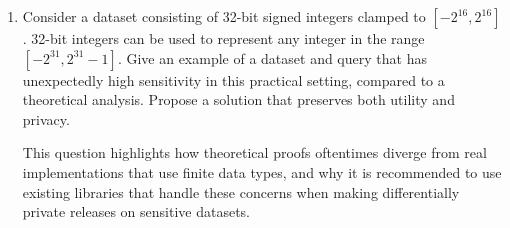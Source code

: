 \documentclass[11pt]{article}
\begin{document}
\begin{enumerate}
\item Consider a dataset consisting of 32-bit signed integers clamped to $[-2^{16},2^{16}]$. 32-bit integers can be used to represent any integer in the range $[-2^{31},2^{31}-1]$.
Give an example of a dataset and query that has unexpectedly high sensitivity in this practical setting, compared to a theoretical analysis.
Propose a solution that preserves both utility and privacy.

This question highlights how theoretical proofs oftentimes diverge from real implementations that use finite data types, and why it is recommended to use existing libraries that handle these concerns when making differentially private releases on sensitive datasets.

\end{enumerate}
\end{document}
